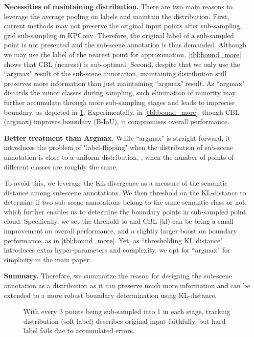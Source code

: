 \documentclass[10pt,twocolumn,letterpaper]{article}
\begin{document}
\noindent\textbf{Necessities of maintaining distribution.}
There are two main reasons to leverage the average pooling on labels and maintain the distribution. First, current methods may not preserve the original input points after sub-sampling, \eg grid sub-sampling in KPConv\cite{kpconv}. Therefore, the original label of a sub-sampled point is not presented and the sub-scene annotation is thus demanded. Although we may use the label of the nearest point for approximation, \cref{tbl:bound_more} shows that CBL (nearest) is sub-optimal. Second, despite that we only use the ``argmax" result of the sub-scene annotation, maintaining distribution still preserves more information than just maintaining ``argmax" result. As ``argmax" discards the minor classes during sampling, such elimination of minority may further accumulate through more sub-sampling stages and leads to imprecise boundary, as depicted in \cref{fig:softvshard}. Experimentally, in \cref{tbl:bound_more}, though CBL (argmax) improves boundary (B-IoU), it compromises overall performance.

\noindent\textbf{Better treatment than Argmax.}
While ``argmax" is straight forward, it introduces the problem of "label-flipping" when the distribution of sub-scene annotation is close to a uniform distribution, \ie, when the number of points of different classes are roughly the same.

To avoid this, we leverage the KL divergence as a measure of the semantic distance among sub-scene annotations. We then threshold on the KL-distance to determine if two sub-scene annotations belong to the same semantic class or not, which further enables us to determine the boundary points in sub-sampled point cloud. Specifically, we set the threhold to  and CBL (kl) can be bring a small improvement on overall performance, and a slightly larger boost on boundary performance, as in \cref{tbl:bound_more}. Yet, as ``thresholding KL distance" introduces extra hyper-parameters and complexity, we opt for ``argmax" for simplicity in the main paper.

\noindent\textbf{Summary.}
Therefore, we summarize the reason for designing the sub-scene annotation as a distribution as it can preserve much more information and can be extended to a more robust boundary determination using KL-distance.

\begin{figure}
\centering
{}\caption{With every 3 points being sub-sampled into 1 in each stage, tracking distribution (soft label) describes original input faithfully, but hard label fails due to accumulated errors.}
\label{fig:softvshard}
\end{figure}
\end{document}
